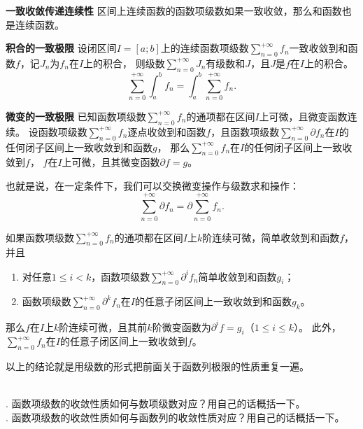 \documentclass[12pt,UTF8]{ctexbook}
\begin{document}
\begin{tm}{\textbf{一致收敛传递连续性}}
    区间上连续函数的函数项级数如果一致收敛，那么和函数也是连续函数。
\end{tm}

\begin{tm}{\textbf{积合的一致极限}}
    设闭区间$I=[a;b]$上的连续函数项级数$\sum_{n=0}^{+\infty} f_n$一致收敛到和函数$f$，记$J_n$为$f_n$在$I$上的积合，
    则级数$\sum_{n=0}^{+\infty} J_n$有级数和$J$，且$J$是$f$在$I$上的积合。
    $$ \sum_{n=0}^{+\infty} \int_a^b f_n = \int_a^b \sum_{n=0}^{+\infty} f_n. $$
\end{tm}

\begin{tm}{\textbf{微变的一致极限}}
    已知函数项级数$\sum_{n=0}^{+\infty} f_n$的通项都在区间$I$上可微，且微变函数连续。
    设函数项级数$\sum_{n=0}^{+\infty} f_n$逐点收敛到和函数$f$，且函数项级数$\sum_{n=0}^{+\infty} \partial f_n$在$I$的任何闭子区间上一致收敛到和函数$g$，
    那么$\sum_{n=0}^{+\infty} f_n$在$I$的任何闭子区间上一致收敛到$f$，
    $f$在$I$上可微，且其微变函数$\partial f = g$。

    也就是说，在一定条件下，我们可以交换微变操作与级数求和操作：
    $$ \sum_{n=0}^{+\infty} \partial f_n = \partial \sum_{n=0}^{+\infty} f_n. $$
    
    如果函数项级数$\sum_{n=0}^{+\infty} f_n$的通项都在区间$I$上$k$阶连续可微，简单收敛到和函数$f$，并且
    \begin{enumerate}
        \item 对任意$1 \leqslant i < k$，函数项级数$\sum_{n=0}^{+\infty} \partial^i f_n$简单收敛到和函数$g_i$；
        \item 函数项级数$\sum_{n=0}^{+\infty} \partial^k f_n$在$I$的任意子闭区间上一致收敛到和函数$g_k$。
    \end{enumerate}
    那么$f$在$I$上$k$阶连续可微，且其前$k$阶微变函数为$\partial^i f = g_i$（$1 \leqslant i\leqslant k$）。
    此外，$\sum_{n=0}^{+\infty} f_n$在$I$的任意子闭区间上一致收敛到$f$。
\end{tm}

以上的结论就是用级数的形式把前面关于函数列极限的性质重复一遍。

\begin{sk}
    \mbox{} \\
    . 函数项级数的收敛性质如何与数项级数对应？用自己的话概括一下。\\
    . 函数项级数的收敛性质如何与函数列的收敛性质对应？用自己的话概括一下。
\end{sk}
\end{document}
